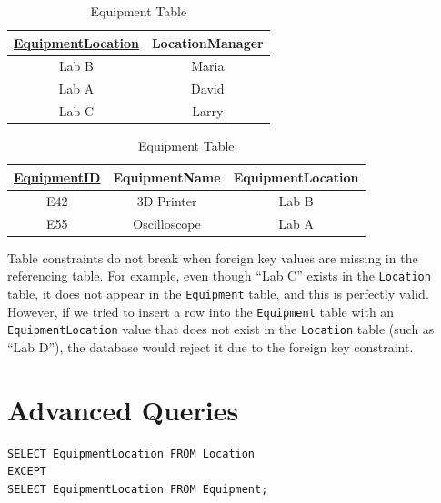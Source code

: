 \begin{table}[H]
\centering
\begin{minipage}[t]{0.48\textwidth}
\centering
\begin{tabular}{|c|c|}
\hline
{\underline{EquipmentLocation}} & {LocationManager} \\
\hline
Lab B & Maria \\
\hline
Lab A & David \\
\hline
Lab C & Larry \\
\hline
\end{tabular}
\caption{Location Table}
\label{tab:location_pk}
\end{minipage}
\hfill
\begin{minipage}[t]{0.48\textwidth}
\centering
\begin{tabular}{|c|c|c|}
\hline
{\underline{EquipmentID}} & {EquipmentName} & {EquipmentLocation} \\
\hline
E42 & 3D Printer & Lab B \\
\hline
E55 & Oscilloscope & Lab A \\
\hline
\end{tabular}
\caption{Equipment Table}
\label{tab:equipment_fk}
\end{minipage}
\end{table}

Table constraints do not break when foreign key values are missing in the referencing table. For example, even though ``Lab C'' exists in the \texttt{Location} table, it does not appear in the \texttt{Equipment} table, and this is perfectly valid. 
However, if we tried to insert a row into the \texttt{Equipment} table with an \texttt{EquipmentLocation} value that does not exist in the \texttt{Location} table (such as ``Lab D''), the database would reject it due to the foreign key constraint.

\section{Advanced Queries}

\begin{translation}
  \sqlrow
\begin{verbatim}
SELECT EquipmentLocation FROM Location
EXCEPT
SELECT EquipmentLocation FROM Equipment;
\end{verbatim}
\end{translation}

